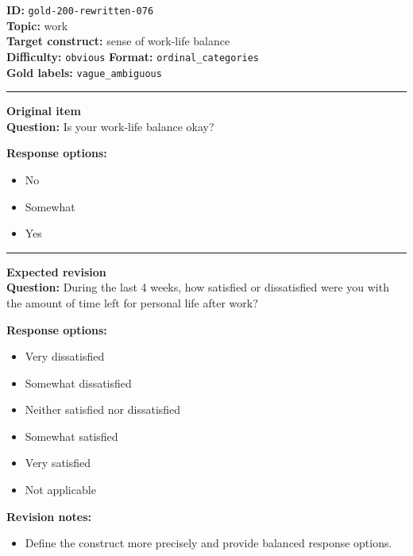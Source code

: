 \documentclass[10pt,a4paper]{article}
\newcommand{\sectionline}{\vspace{0.15em}\hrule\vspace{0.35em}}
\begin{document}
\begin{tcolorbox}[colframe=FlawRed,colback=white,colbacktitle=FlawRed!9,coltitle=black,title={Item 076\hfill Flawed item}]
\textbf{ID:} \texttt{gold-200-rewritten-076}\\
\textbf{Topic:} work\\
\textbf{Target construct:} sense of work-life balance\\
\textbf{Difficulty:} \texttt{obvious} \quad \textbf{Format:} \texttt{ordinal\_categories}\\
\textbf{Gold labels:} \texttt{vague\_ambiguous}\\
\sectionline
\textbf{Original item}\\
\textbf{Question:} Is your work-life balance okay?
\par\textbf{Response options:}
\begin{itemize}
\item No
\item Somewhat
\item Yes
\end{itemize}
\sectionline
\textbf{Expected revision}\\
\textbf{Question:} During the last 4 weeks, how satisfied or dissatisfied were you with the amount of time left for personal life after work?
\par\textbf{Response options:}
\begin{itemize}
\item Very dissatisfied
\item Somewhat dissatisfied
\item Neither satisfied nor dissatisfied
\item Somewhat satisfied
\item Very satisfied
\item Not applicable
\end{itemize}
\par\textbf{Revision notes:}
\begin{itemize}
\item Define the construct more precisely and provide balanced response options.
\end{itemize}
\end{tcolorbox}
\end{document}
